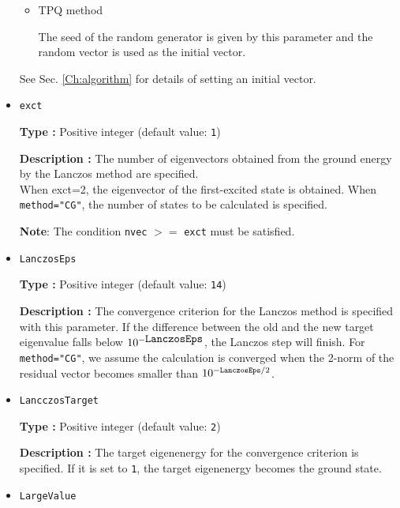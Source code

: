 \begin{itemize}
\begin{itemize}
\item{TPQ method}

The seed of the random generator is given by this parameter and the random vector is used as the initial vector.
\end{itemize}
See Sec. \ref{Ch:algorithm} for details of setting an initial vector.




\item \verb|exct|

{\bf Type :} Positive integer (default value: \verb|1|)

{\bf Description :} The number of eigenvectors obtained from the ground energy by the Lanczos method are specified.\\
When exct=2, the eigenvector of the first-excited state is obtained.
When \verb|method="CG"|, the number of states to be calculated is specified.

{\bf Note}: The condition \verb|nvec| $>=$ \verb|exct| must be satisfied.

\item \verb|LanczosEps|

{\bf Type :} Positive integer (default value: \verb|14|)

{\bf Description :} The convergence criterion for the Lanczos method is specified with this parameter.
If the difference between the old and the new target eigenvalue falls below $10^{- \verb|LanczosEps|}$, 
the Lanczos step will finish.
For \verb|method="CG"|, we assume the calculation is converged
when the 2-norm of the residual vector becomes smaller than $10^{-{\tt LanczosEps}/2}$.

\item \verb|LancczosTarget|

{\bf Type :} Positive integer (default value: \verb|2|)

{\bf Description :} The target eigenenergy for the convergence criterion is specified.
If it is set to \verb|1|, the target eigenenergy becomes the ground state.

\item \verb|LargeValue|


\end{itemize}
